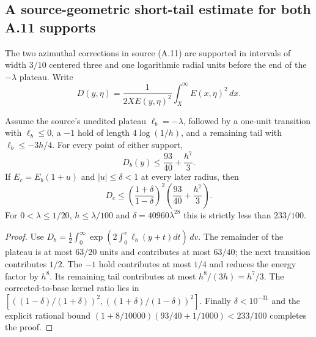 \subsection*{A source-geometric short-tail estimate for both A.11 supports}
The two azimuthal corrections in source (A.11) are supported in intervals
of width $3/10$ centered three and one logarithmic radial units before
the end of the $-\lambda$ plateau. Write
\[
D(y,\eta)=\frac{1}{2XE(y,\eta)^2}\int_X^\infty E(x,\eta)^2\,dx.
\]
\begin{proposition}\label{prop:a11-short-tail-new}
Assume the source's unedited plateau $\ell_b=-\lambda$, followed by
a one-unit transition with $\ell_b\le0$, a $-1$ hold of length
$4\log(1/h)$, and a remaining tail with $\ell_b\le-3h/4$.
For every point of either support,
\[
D_b(y)\le\frac{93}{40}+\frac{h^7}{3}.
\]
If $E_c=E_b(1+u)$ and $|u|\le\delta<1$ at every later radius,
then
\[
D_c\le\left(\frac{1+\delta}{1-\delta}\right)^2
 \left(\frac{93}{40}+\frac{h^7}{3}\right).
\]
For $0<\lambda\le1/20$, $h\le\lambda/100$ and
$\delta=40960\lambda^{28}$ this is strictly less than $233/100$.
\end{proposition}
\begin{proof}
Use $D_b=\frac12\int_0^\infty
\exp(2\int_0^v\ell_b(y+t)dt)\,dv$.
The remainder of the plateau is at most $63/20$ units and
contributes at most $63/40$; the next transition contributes
$1/2$. The $-1$ hold contributes at most $1/4$ and reduces
the energy factor by $h^8$. Its remaining tail contributes
at most $h^8/(3h)=h^7/3$.
The corrected-to-base kernel ratio lies in
$[((1-\delta)/(1+\delta))^2,
((1+\delta)/(1-\delta))^2]$.
Finally $\delta<10^{-31}$ and the explicit rational bound
$(1+8/10000)(93/40+1/1000)<233/100$ completes the proof.
\end{proof}


